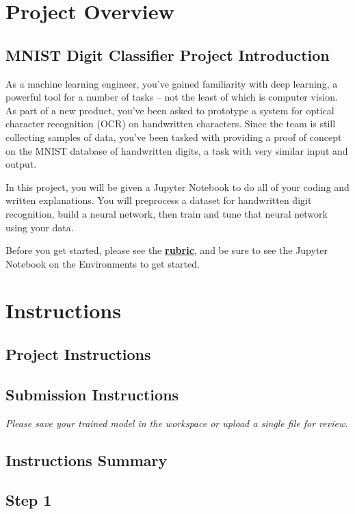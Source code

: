 
\section{Project Overview}

\subsection{MNIST Digit Classifier Project Introduction}
As a machine learning engineer, you’ve gained familiarity with deep learning, a powerful tool for a number of tasks – not the least of which is computer vision. As part of a new product, you’ve been asked to prototype a system for optical character recognition (OCR) on handwritten characters. Since the team is still collecting samples of data, you’ve been tasked with providing a proof of concept on the MNIST database of handwritten digits, a task with very similar input and output.

In this project, you will be given a Jupyter Notebook to do all of your coding and written explanations. You will preprocess a dataset for handwritten digit recognition, build a neural network, then train and tune that neural network using your data.

Before you get started, please see the \href{https://learn.udacity.com/rubric/4816}{\textbf{rubric}}, and be sure to see the Jupyter Notebook on the Environments to get started.

\section{Instructions}

\subsection{Project Instructions}

\subsection{Submission Instructions}

\textit{Please save your trained model in the workspace or upload a single file for review.}

\subsection{Instructions Summary}

\subsection{Step 1}

